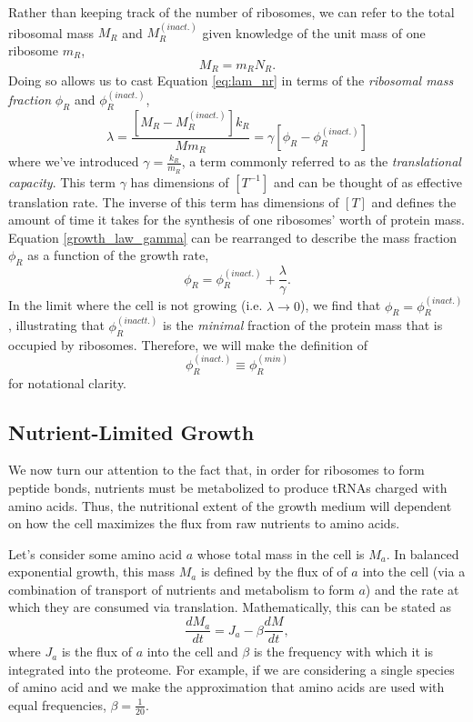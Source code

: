 \documentclass[letterpaper, 11pt]{article}
\begin{document}
Rather than keeping track of the number of ribosomes, we can refer to the total 
ribosomal mass $M_R$ and $M_R^{(inact.)}$ given knowledge of the unit mass of
one ribosome $m_R$, 
\begin{equation}
M_R = m_R N_R.
\label{eq:ribo_mass}
\end{equation}
Doing so allows us to cast Equation \eqref{eq:lam_nr} in terms of the
\textit{ribosomal mass fraction} $\phi_R$ and $\phi_R^{(inact.)}$, 
\begin{equation}
\lambda = \frac{\left[M_R - M_R^{(inact.)}\right]k_R}{M m_R} = \gamma\left[\phi_R - \phi_R^{(inact.)}\right]
\label{eq:growth_law_gamma}
\end{equation}
where we've introduced $\gamma = \frac{k_R}{m_R}$, a term commonly referred to
as  the \textit{translational capacity}. This term $\gamma$ has dimensions of
$[T^{-1}]$ and can be thought of as effective translation rate. The inverse of
this term has dimensions of $[T]$ and defines the amount of time it takes for 
the synthesis of one ribosomes' worth of protein mass. Equation
\eqref{growth_law_gamma} can be rearranged to describe the mass fraction
$\phi_R$ as a function of the growth rate, 
\begin{equation}
\phi_R = \phi_R^{(inact.)} + \frac{\lambda}{\gamma}.
\label{eq:growth_law_gamma_phir}
\end{equation}
In the limit where the cell is not growing (i.e. $\lambda \rightarrow 0$), we 
find that $\phi_R = \phi_R^{(inact.)}$, illustrating that $\phi_R^{(inactt.)}$ 
is the \textit{minimal} fraction of the protein mass that is occupied by
ribosomes. Therefore, we will make the definition of 
\begin{equation}
\phi_R^{(inact.)} \equiv \phi_R^{(min)}
\label{eq:phir_min_def}
\end{equation}
for notational clarity. 

\subsection{Nutrient-Limited Growth}
We now turn our attention to the fact that, in order for ribosomes to form 
peptide bonds, nutrients must be metabolized to produce tRNAs charged with amino
acids. Thus, the nutritional extent of the growth medium will dependent on 
how the cell maximizes the flux from raw nutrients to amino acids. 

Let's consider some amino acid $a$ whose total mass in the cell is $M_a$. In
balanced exponential growth, this mass $M_a$ is defined by the flux of of $a$ 
into the cell (via a combination of transport of nutrients and metabolism to
form $a$) and the rate at which they are consumed via translation.
Mathematically, this can be stated as
\begin{equation}
\frac{dM_a}{dt} = J_a - \beta \frac{dM}{dt},
\label{eq:dma_dt}
\end{equation}
where $J_a$ is the flux of $a$ into the cell and $\beta$ is the frequency with
which it is integrated into the proteome. For example, if we are considering a
single species of amino acid and we make the approximation that amino acids are 
used with equal frequencies, $\beta = \frac{1}{20}$. 
\end{document}
